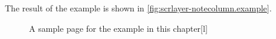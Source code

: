 The result of the example is shown in
\autoref{fig:scrlayer-notecolumn.example}.

\begin{figure}
  \setcapindent{0pt}%
  \begin{captionbeside}{A sample page for the example in
      this chapter\label{fig:scrlayer-notecolumn.example}}[l]
  \end{captionbeside}
\end{figure}
\EndIndexGroup
%
\EndIndexGroup


